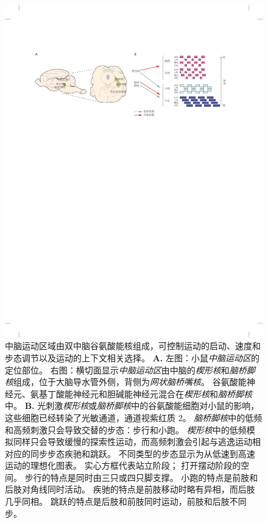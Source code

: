 \begin{figure}[htbp]
	\centering
	\includegraphics[width=1.0\linewidth]{chap33/fig_33_11}
	\caption{中脑运动区域由双中脑谷氨酸能核组成，可控制运动的启动、速度和步态调节以及运动的上下文相关选择。
		\textbf{A.} 左图：小鼠\textit{中脑运动区}的定位部位。
		右图：横切面显示\textit{中脑运动区}由中脑的\textit{楔形核}和\textit{脑桥脚核}组成，位于大脑导水管外侧，背侧为\textit{网状脑桥嘴核}。
		谷氨酸能神经元、氨基丁酸能神经元和胆碱能神经元混合在\textit{楔形核}和\textit{脑桥脚核}中。
		\textbf{B.} 光刺激\textit{楔形核}或\textit{脑桥脚核}中的谷氨酸能细胞对小鼠的影响，这些细胞已经转染了光敏通道，通道视紫红质 2。
		\textit{脑桥脚核}中的低频和高频刺激只会导致交替的步态：步行和小跑。
		\textit{楔形核}中的低频模拟同样只会导致缓慢的探索性运动，而高频刺激会引起与逃逸运动相对应的同步步态疾驰和跳跃。
		不同类型的步态显示为从低速到高速运动的理想化图表。
		实心方框代表站立阶段；
		打开摆动阶段的空间。
		步行的特点是同时由三只或四只脚支撑。
		小跑的特点是前肢和后肢对角线同时活动。
		疾驰的特点是前肢移动时略有异相，而后肢几乎同相。
		跳跃的特点是后肢和前肢同时运动，前肢和后肢不同步\cite{caggiano2018midbrain}。}
	\label{fig:33_11}
\end{figure}



